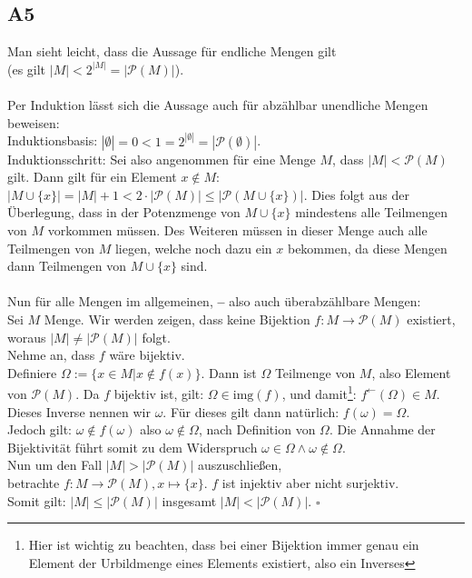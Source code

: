\documentclass[12pt, a4paper]{article}
\newcommand*{\qed}{\null\nobreak\hfill\ensuremath{\square}}
\newcommand*{\gedanke}{\textbf{-- }}
\begin{document}
\subsection*{A5}
Man sieht leicht, dass die Aussage für endliche Mengen gilt\\
(es gilt \(|M| < 2^{|M|} = |\mathcal P(M)|\)). \\ \\ Per Induktion lässt sich die Aussage auch für abzählbar unendliche Mengen beweisen:\\
Induktionsbasis: \(|\emptyset| = 0 < 1 = 2^{|\emptyset|} = |\mathcal P(\emptyset)|\). \\
Induktionsschritt: Sei also angenommen für eine Menge \(M\), dass \(|M| < \mathcal{P}(M)\) gilt. Dann gilt für ein Element \(x \not\in M\):\\
\(|M \cup \{x\}| = |M| + 1 < 2\cdot |\mathcal P (M)| \le |\mathcal P(M \cup \{x\})|\). Dies folgt aus der Überlegung, dass in der Potenzmenge von \(M \cup \{x\}\) mindestens alle Teilmengen von \(M\) vorkommen müssen. Des Weiteren müssen in dieser Menge auch alle Teilmengen von \(M\) liegen, welche noch dazu ein \(x\) bekommen, da diese Mengen dann Teilmengen von \(M \cup \{x\}\) sind. \\ \\
Nun für alle Mengen im allgemeinen, \gedanke also auch überabzählbare Mengen: \\
Sei \(M\) Menge. Wir werden zeigen, dass keine Bijektion \(f: M \rightarrow \mathcal P (M)\) existiert, woraus \(|M| \ne |\mathcal P (M)|\) folgt. \\
Nehme an, dass \(f\) wäre bijektiv. \\
Definiere \(\Omega := \{ x \in M | x \not\in f(x)\}.\) Dann ist \(\Omega\) Teilmenge von \(M\), also Element von \(\mathcal P (M)\). Da \(f\) bijektiv ist, gilt: \(\Omega \in \text{img}(f)\), und damit\footnote[1]{Hier ist wichtig zu beachten, dass bei einer Bijektion immer genau ein Element der Urbildmenge eines Elements existiert, also ein Inverses}: \(f^\leftarrow (\Omega) \in M\). Dieses Inverse nennen wir \(\omega\). Für dieses gilt dann natürlich: \(f(\omega) = \Omega\). \\
Jedoch gilt: \(\omega \not\in f(\omega)\) also \(\omega \not\in \Omega\), nach Definition von \(\Omega\). Die Annahme der Bijektivität führt somit zu dem Widerspruch \(\omega \in \Omega \wedge \omega \not\in \Omega\). \\
Nun um den Fall \(|M| > |\mathcal P (M)|\) auszuschließen,\\
betrachte \(f: M \rightarrow \mathcal P(M), x \mapsto \{x\}\). \(f\) ist injektiv aber nicht surjektiv.\\
Somit gilt: \(|M| \le |\mathcal P (M)|\) insgesamt \(|M| < |\mathcal P (M)|\). \qed
\end{document}
